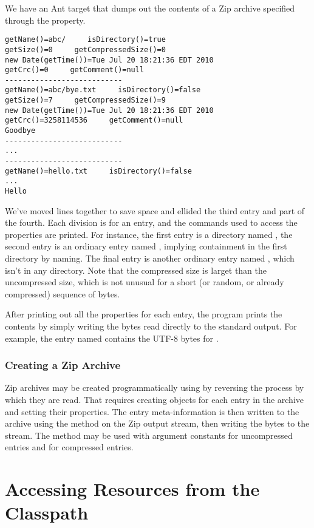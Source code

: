 We have an Ant target  that dumps out
the contents of a Zip archive specified through the
 property.
%
\begin{verbatim}
getName()=abc/     isDirectory()=true
getSize()=0     getCompressedSize()=0
new Date(getTime())=Tue Jul 20 18:21:36 EDT 2010
getCrc()=0     getComment()=null
---------------------------
getName()=abc/bye.txt     isDirectory()=false
getSize()=7     getCompressedSize()=9
new Date(getTime())=Tue Jul 20 18:21:36 EDT 2010
getCrc()=3258114536     getComment()=null
Goodbye
---------------------------
...
---------------------------
getName()=hello.txt     isDirectory()=false     
...
Hello
\end{verbatim}
%
We've moved lines together to save space and ellided the third entry
and part of the fourth.  Each division is for an entry, and the
commands used to access the properties are printed.  For instance, the
first entry is a directory named , the second entry is an
ordinary entry named , implying containment in the
first directory by naming.  The final entry is another ordinary entry
named , which isn't in any directory.  Note that the
compressed size is larget than the uncompressed size, which is not
unusual for a short (or random, or already compressed) sequence of
bytes.

After printing out all the properties for each entry, the program
prints the contents by simply writing the bytes read directly to the
standard output.  For example, the entry named 
contains the UTF-8 bytes for .


\subsubsection{Creating a Zip Archive}

Zip archives may be created programmatically using
 by reversing the process by which they are
read.  That requires creating  objects for each entry
in the archive and setting their properties.  The entry
meta-information is then written to the archive using the
 method on the Zip output stream, then writing
the bytes to the stream.  The method  may be used
with argument constants  for uncompressed entries
and  for compressed entries.


\section{Accessing Resources from the Classpath}



